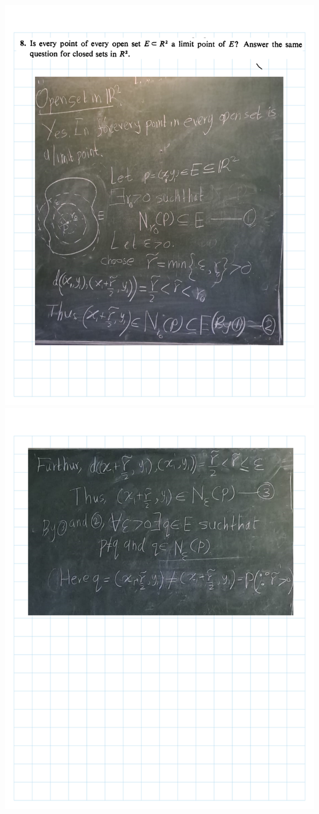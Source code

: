 \documentclass[
]{book}
\theoremstyle{definition}
\theoremstyle{definition}
\theoremstyle{definition}
\theoremstyle{definition}
\theoremstyle{remark}
\begin{document}
\includegraphics{Figures/Ex-2/Rudin Ch2-1/Rudin Ch2-1-3.png}
\includegraphics{Figures/Ex-2/Rudin Ch2-1/Rudin Ch2-1-4.png}
\end{document}

